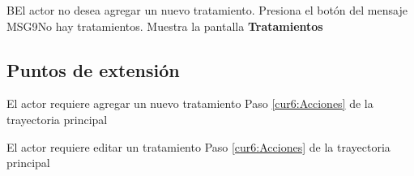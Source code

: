 \begin{UCtrayectoriaA}{B}{El actor no desea agregar un nuevo tratamiento.}
    \UCpaso[\UCactor] Presiona el botón  del mensaje {MSG9}{No hay tratamientos}.
    \UCpaso[] Muestra la pantalla \textbf{Tratamientos}
 \end{UCtrayectoriaA}
 
 
\subsection{Puntos de extensión}

\UCExtensionPoint
{El actor requiere agregar un nuevo tratamiento}
{ Paso \ref{cur6:Acciones} de la trayectoria principal}
{}


\UCExtensionPoint
{El actor requiere editar un tratamiento}
{ Paso \ref{cur6:Acciones} de la trayectoria principal}
{}

 

